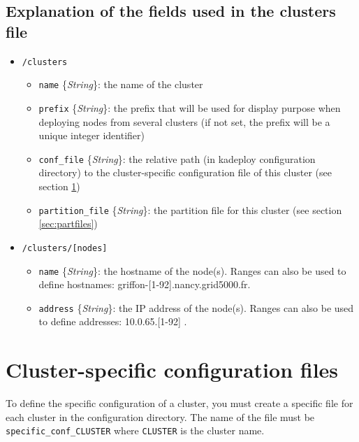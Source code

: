 \documentclass[a4wide,10pt,oneside]{book}
\newcommand{\ypath}[1]{\texttt{#1}}
\newcommand{\yfield}[2]{\texttt{#1} {\small\{{\emph{#2}}\}}:}
\begin{document}
\subsection{Explanation of the fields used in the clusters file\\}
\begin{itemize}
  \item \ypath{/clusters}
  \begin{itemize}
    \item \yfield{name}{String} the name of the cluster
    \item \yfield{prefix}{String} the prefix that will be used for display purpose when deploying nodes from several clusters (if not set, the prefix will be a unique integer identifier)
    \item \yfield{conf\_file}{String} the relative path (in kadeploy configuration directory) to the cluster-specific configuration file of this cluster (see section \ref{sec:specific_config})
    \item \yfield{partition\_file}{String} the partition file for this cluster (see section \ref{sec:partfiles})
  \end{itemize}

  \item \ypath{/clusters/[nodes]}
  \begin{itemize}
    \item \yfield{name}{String} the hostname of the node(s). Ranges can also be used to define hostnames: griffon-[1-92].nancy.grid5000.fr.
    \item \yfield{address}{String} the IP address of the node(s). Ranges can also be used to define addresses: 10.0.65.[1-92] .
  \end{itemize}
\end{itemize}

\section{Cluster-specific configuration files}\label{sec:specific_config}
To define the specific configuration of a cluster, you must create a specific file for each cluster in the configuration directory. The name of the file must be \texttt{specific\_conf\_CLUSTER} where \texttt{CLUSTER} is the cluster name.
\end{document}
